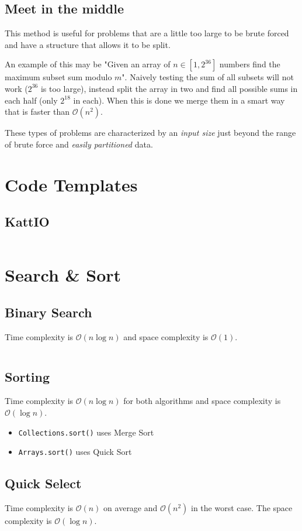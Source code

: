 \documentclass[8pt,a4paper,landscape,oneside]{amsart}
\newcommand{\code}[1]{\inputminted[fontsize=\normalsize,baselinestretch=1]{java}{code/#1}}
\newcommand{\bigO}{\mathcal{O}}
\begin{document}
\begin{multicols*}{3}
  \subsection{Meet in the middle}
  This method is useful for problems that are a little too large to be brute forced and have a structure that allows it to be split. 
  
  An example of this may be "Given an array of $n \in [1, 2^{36}]$ numbers find the maximum subset sum modulo $m$". Naively testing the sum of all subsets will not work ($2^{36}$ is too large), instead split the array in two and find all possible sums in each half (only $2^{18}$ in each). When this is done we merge them in a smart way that is faster than $\bigO(n^2)$.
  
  These types of problems are characterized by an \emph{input size} just beyond the range of brute force and \emph{easily partitioned} data.


\section{Code Templates}
  \subsection{KattIO}
  \code{Kattio.java}
  
  
\section{Search \& Sort}
  \subsection{Binary Search}
  Time complexity is $\bigO(n \log n)$ and space complexity is $\bigO(1)$.
  \code{Structures/BinarySearch.java}
  
  \subsection{Sorting}
  Time complexity is $\bigO(n \log n)$ for both algorithms and space complexity is $\bigO(\log n)$.
  \begin{itemize}
  \item \texttt{Collections.sort()} uses Merge Sort
  \item \texttt{Arrays.sort()} uses Quick Sort
  \end{itemize}
  
  \subsection{Quick Select}
  Time complexity is $\bigO(n)$ on average and $\bigO(n^2)$ in the worst case. The space complexity is $\bigO(\log n)$.
  \code{Structures/QuickSelect.java}
  

\end{multicols*}
\end{document}
